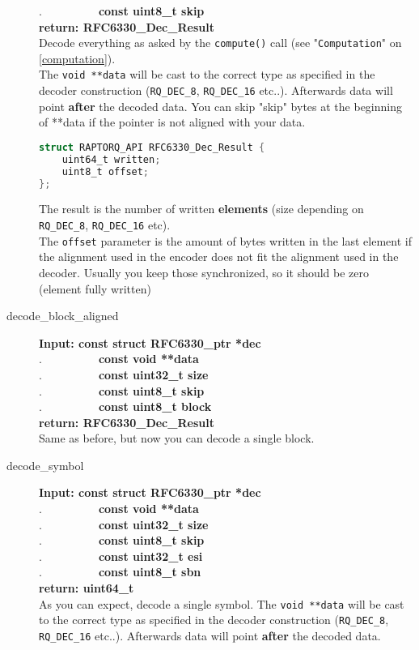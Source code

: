 \documentclass[11pt,a4paper]{refart}
\begin{document}
\begin{description}
.\ \ \ \ \ \ \ \ \ \ \textbf{const uint8\_t skip}\\
\textbf{return: RFC6330\_Dec\_Result}\\
Decode everything as asked by the \texttt{compute()} call (see "\texttt{Computation}" on \ref{computation}).\\
The \texttt{void **data} will be cast to the correct type as specified in the decoder construction (\texttt{RQ\_DEC\_8}, \texttt{RQ\_DEC\_16} etc..). Afterwards data will point \textbf{after} the decoded data. You can skip "skip" bytes at the beginning of **data if the pointer
is not aligned with your data.
\begin{lstlisting}[language=C]
struct RAPTORQ_API RFC6330_Dec_Result {
	uint64_t written;
	uint8_t offset;
};
\end{lstlisting}
The result is the number of written \textbf{elements} (size depending on \texttt{RQ\_DEC\_8}, \texttt{RQ\_DEC\_16} etc).\\
The \texttt{offset} parameter is the amount of bytes written in the last element if the alignment used in the encoder does not fit the
alignment used in the decoder. Usually you keep those synchronized, so it should be zero (element fully written)
\item[decode\_block\_aligned]\textbf{Input: const struct RFC6330\_ptr *dec}\\
.\ \ \ \ \ \ \ \ \ \ \textbf{const void **data}\\
.\ \ \ \ \ \ \ \ \ \ \textbf{const uint32\_t size}\\
.\ \ \ \ \ \ \ \ \ \ \textbf{const uint8\_t skip}\\
.\ \ \ \ \ \ \ \ \ \ \textbf{const uint8\_t block}\\
\textbf{return: RFC6330\_Dec\_Result}\\
Same as before, but now you can decode a single block.
\newpage
\item[decode\_symbol]\textbf{Input: const struct RFC6330\_ptr *dec}\\
.\ \ \ \ \ \ \ \ \ \ \textbf{const void **data}\\
.\ \ \ \ \ \ \ \ \ \ \textbf{const uint32\_t size}\\
.\ \ \ \ \ \ \ \ \ \ \textbf{const uint8\_t skip}\\
.\ \ \ \ \ \ \ \ \ \ \textbf{const uint32\_t esi}\\
.\ \ \ \ \ \ \ \ \ \ \textbf{const uint8\_t sbn}\\
\textbf{return: uint64\_t}\\
As you can expect, decode a single symbol. The \texttt{void **data} will be cast to the correct type as specified in the decoder construction (\texttt{RQ\_DEC\_8}, \texttt{RQ\_DEC\_16} etc..). Afterwards data will point \textbf{after} the decoded data.\\

\end{description}
\end{document}
